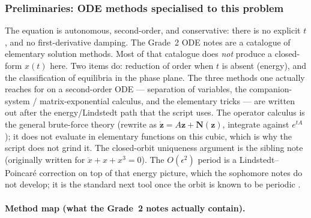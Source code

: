 \documentclass[11pt,a4paper]{article}
\begin{document}
\setcounter{section}{6}
\setcounter{theorem}{0}
\setcounter{definition}{0}
\setcounter{remark}{0}
\setcounter{note}{0}

\subsubsection{Preliminaries: ODE methods specialised to this problem}

The equation is autonomous, second-order, and conservative: there is no explicit \(t\), and no first-derivative damping. The Grade~2 ODE notes \cite{grade2ode} are a catalogue of elementary solution methods. Most of that catalogue does \emph{not} produce a closed-form \(x(t)\) here. Two items do: reduction of order when \(t\) is absent (energy), and the classification of equilibria in the phase plane. The three methods one actually reaches for on a second-order ODE --- separation of variables, the companion-system / matrix-exponential calculus, and the elementary tricks --- are written out after the energy/Lindstedt path that the script uses. The operator calculus is the general brute-force theory (rewrite as \(\dot{\mathbf{z}}=A\mathbf{z}+\mathbf{N}(\mathbf{z})\), integrate against \(e^{tA}\)); it does not evaluate in elementary functions on this cubic, which is why the script does not grind it. The closed-orbit uniqueness argument is the sibling note \cite{grade2period} (originally written for \(\ddot x+x+x^{3}=0\)). The \(O(\epsilon^{2})\) period is a Lindstedt--Poincar\'e correction on top of that energy picture, which the sophomore notes do not develop; it is the standard next tool once the orbit is known to be periodic \cite{nayfeh73}.

\paragraph{Method map (what the Grade~2 notes actually contain).}
\end{document}
